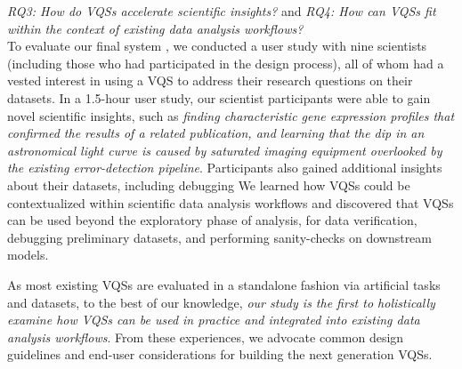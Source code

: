 \noindent \emph{RQ3: How do VQSs accelerate scientific insights?} and \emph{RQ4: How can VQSs fit within the context of existing data analysis workflows?}
\\ To evaluate our final system \zv, we conducted a user study with nine scientists (including those who had participated in the design process), all of whom had a vested interest in using a VQS to address their research questions on their datasets. In a 1.5-hour user study, our scientist participants were able to gain novel scientific insights, such as \emph{ finding characteristic gene expression profiles that confirmed the results of a related publication, and learning that the dip in an astronomical light curve is caused by saturated imaging equipment overlooked by the existing error-detection pipeline}.  Participants also gained additional insights about their datasets, including debugging 
We learned how VQSs could be contextualized within scientific data analysis workflows and discovered that VQSs can be used beyond the exploratory phase of analysis, for data verification, debugging preliminary datasets, and performing sanity-checks on downstream models.
\par As most existing VQSs are evaluated in a standalone fashion via artificial tasks and datasets, to the best of our knowledge, \emph{our study is the first to holistically examine how VQSs can be used in practice and integrated into existing data analysis workflows}. From these experiences, we advocate common design guidelines and end-user considerations for building the next generation VQSs.
